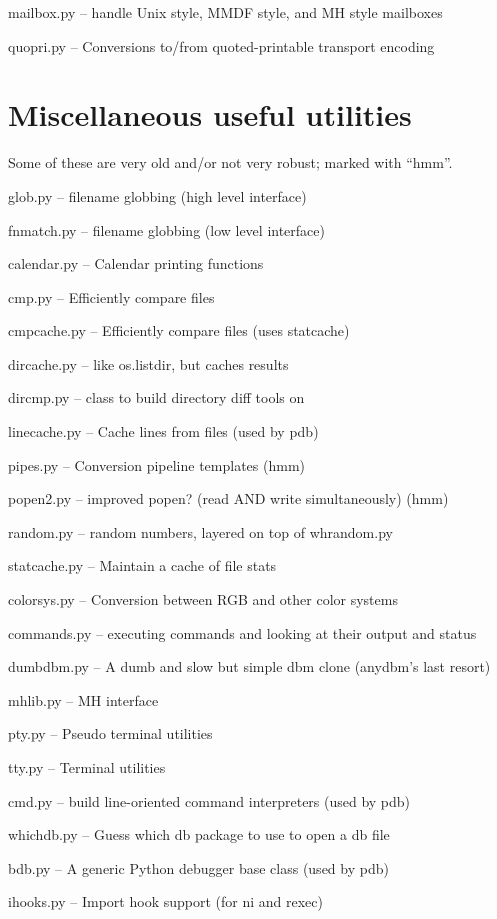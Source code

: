 mailbox.py -- handle Unix style, MMDF style, and MH style mailboxes

quopri.py -- Conversions to/from quoted-printable transport encoding


\section{Miscellaneous useful utilities}

Some of these are very old and/or not very robust; marked with ``hmm''.

glob.py -- filename globbing (high level interface)

fnmatch.py -- filename globbing (low level interface)

calendar.py -- Calendar printing functions

cmp.py -- Efficiently compare files

cmpcache.py -- Efficiently compare files (uses statcache)

dircache.py -- like os.listdir, but caches results

dircmp.py -- class to build directory diff tools on

linecache.py -- Cache lines from files (used by pdb)

pipes.py -- Conversion pipeline templates (hmm)

popen2.py -- improved popen? (read AND write simultaneously) (hmm)

random.py -- random numbers, layered on top of whrandom.py

statcache.py -- Maintain a cache of file stats

colorsys.py -- Conversion between RGB and other color systems

commands.py -- executing commands and looking at their output and
status

dumbdbm.py -- A dumb and slow but simple dbm clone (anydbm's last
resort)

mhlib.py -- MH interface

pty.py -- Pseudo terminal utilities

tty.py -- Terminal utilities

cmd.py -- build line-oriented command interpreters (used by pdb)

whichdb.py -- Guess which db package to use to open a db file

bdb.py -- A generic Python debugger base class (used by pdb)

ihooks.py -- Import hook support (for ni and rexec)


